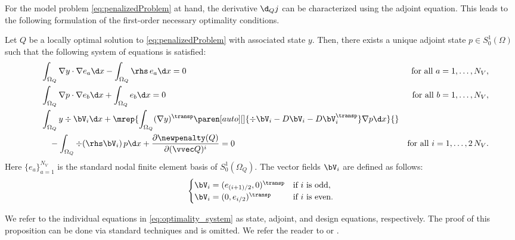 For the model problem \eqref{eq:penalizedProblem} at hand, the derivative $\d_Q j$ can be characterized using the adjoint equation.
This leads to the following formulation of the first-order necessary optimality conditions.
\begin{proposition}
	\label{proposition:optimality_system}
	Let $Q$ be a locally optimal solution to \eqref{eq:penalizedProblem} with associated state $y$.
	Then, there exists a unique adjoint state $p \in S^1_0(\Omega)$ such that the following system of equations is satisfied:
	\begin{subequations}
		\label{eq:optimality_system}
		\begin{align}
			\label{eq:stateEquation}
			\quad
			&
			\int_{\Omega_Q} \nabla y \cdot \nabla e_a \d x
			-
			\int_{\Omega_Q} \rhs \, e_a \d x
			=
			0
			&
			\text{for all } a = 1, \ldots, N_V
			,
			\\
			\label{eq:adjointEquation}
			\quad
			&
			\int_{\Omega_Q}\nabla p \cdot \nabla e_b \d x
			+
			\int_{\Omega_Q} e_b \d x
			=
			0
			&
			\text{for all } b = 1, \ldots, N_V
			,
			\\
			\nonumber
			\quad
			&
			\int_{\Omega_Q} y \div \bV_i \d x
			+
			\mrep{\int_{\Omega_Q} (\nabla y)^\transp \paren[auto][]{\div \bV_i - D\bV_i - D\bV_i^\transp} \nabla p \d x}{}
			\\
			\label{eq:designEquation}
			&
			\quad
			- \int_{\Omega_Q} \div(\rhs \bV_i) \, p \d x
			+
			\frac{\partial \newpenalty (Q)}{\partial (\vvec Q)^i}
			=
			0
			&
			\text{for all } i = 1,\ldots, 2 \, N_V
			.
		\end{align}
	\end{subequations}
	Here $\{e_a\}_{a = 1}^{N_V}$ is the standard nodal finite element basis of $S^1_0(\Omega_Q)$.
	The vector fields $\bV_i$ are defined as follows:
	\begin{equation*}
		\begin{cases}
			\bV_i = (e_{(i+1)/2},0)^\transp & \text{if $i$ is odd},
			\\
			\bV_i = (0,e_{i/2})^\transp & \text{if $i$ is even}.
		\end{cases}
	\end{equation*}
\end{proposition}
We refer to the individual equations in \eqref{eq:optimality_system} as state, adjoint, and design equations, respectively.
The proof of this proposition can be done via standard techniques and is omitted.
We refer the reader to \cite[Theorem~2, p.105]{Pironneau:1984:1} or \cite[Section~4, p.192]{SouliZolesio:1993:1}.


